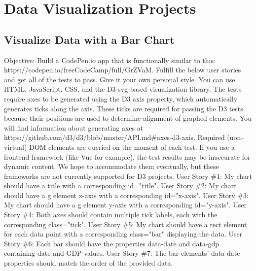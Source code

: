 \documentclass{article}%
\begin{document}
%
\newpage%
\section{Data Visualization Projects}%
\label{sec:DataVisualizationProjects}%
\subsection{Visualize Data with a Bar Chart}%
\label{subsec:VisualizeDatawithaBarChart}%
Objective: Build a CodePen.io app that is functionally similar to this: https://codepen.io/freeCodeCamp/full/GrZVaM.\newline%
Fulfill the below user stories and get all of the tests to pass. Give it your own personal style.\newline%
You can use HTML, JavaScript, CSS, and the D3 svg{-}based visualization library. The tests require axes to be generated using the D3 axis property, which automatically generates ticks along the axis. These ticks are required for passing the D3 tests because their positions are used to determine alignment of graphed elements. You will find information about generating axes at https://github.com/d3/d3/blob/master/API.md\#axes{-}d3{-}axis. Required (non{-}virtual) DOM elements are queried on the moment of each test. If you use a frontend framework (like Vue for example), the test results may be inaccurate for dynamic content. We hope to accommodate them eventually, but these frameworks are not currently supported for D3 projects.\newline%
User Story \#1: My chart should have a title with a corresponding id="title".\newline%
User Story \#2: My chart should have a g element x{-}axis with a corresponding id="x{-}axis".\newline%
User Story \#3: My chart should have a g element y{-}axis with a corresponding id="y{-}axis".\newline%
User Story \#4: Both axes should contain multiple tick labels, each with the corresponding class="tick".\newline%
User Story \#5: My chart should have a rect element for each data point with a corresponding class="bar" displaying the data.\newline%
User Story \#6: Each bar should have the properties data{-}date and data{-}gdp containing date and GDP values.\newline%
User Story \#7: The bar elements' data{-}date properties should match the order of the provided data.\newline%
\end{document}
